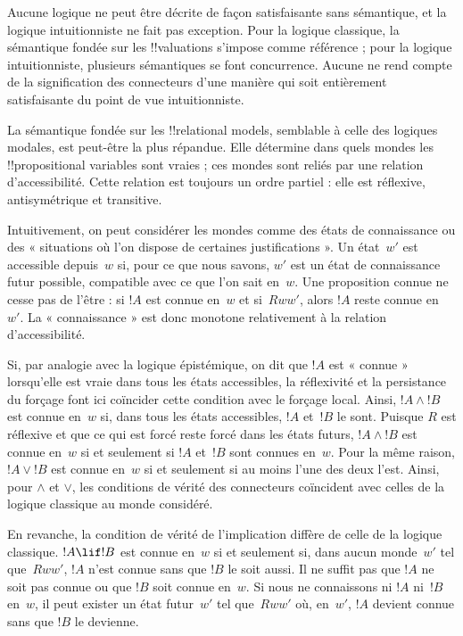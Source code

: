\documentclass[../../../include/open-logic-section]{subfiles}
\begin{document}


Aucune logique ne peut être décrite de façon satisfaisante sans
sémantique, et la logique intuitionniste ne fait pas exception. Pour
la logique classique, la sémantique fondée sur les !!{valuation}s
s'impose comme référence ; pour la logique intuitionniste, plusieurs
sémantiques se font concurrence. Aucune ne rend compte de la
signification des connecteurs d'une manière qui soit entièrement
satisfaisante du point de vue intuitionniste.

La sémantique fondée sur les !!{relational model}s, semblable à celle
des logiques modales, est peut-être la plus répandue. Elle détermine
dans quels mondes les !!{propositional variable}s sont vraies ; ces
mondes sont reliés par une relation d'accessibilité. Cette relation
est toujours un ordre partiel : elle est réflexive, antisymétrique et
transitive.

Intuitivement, on peut considérer les mondes comme des états de
connaissance ou des « situations où l'on dispose de certaines
justifications ». Un état~$w'$ est accessible depuis~$w$ si, pour ce
que nous savons, $w'$ est un état de connaissance futur possible,
compatible avec ce que l'on sait en~$w$. Une proposition connue ne
cesse pas de l'être : si $!A$ est connue en~$w$ et si~$Rww'$, alors
$!A$ reste connue en~$w'$. La « connaissance » est donc monotone
relativement à la relation d'accessibilité.

Si, par analogie avec la logique épistémique, on dit que $!A$ est
« connue » lorsqu'elle est vraie dans tous les états accessibles,
la réflexivité et la persistance du forçage font ici coïncider cette
condition avec le forçage local. Ainsi, $!A \land !B$ est connue
en~$w$ si, dans tous les états accessibles, $!A$ et~$!B$ le sont.
Puisque $R$ est réflexive et que ce qui est forcé reste forcé dans les
états futurs, $!A \land !B$ est connue en~$w$ si et seulement si $!A$
et~$!B$ sont connues en~$w$. Pour la même raison, $!A \lor !B$ est
connue en~$w$ si et seulement si au moins l'une des deux l'est. Ainsi,
pour $\land$ et $\lor$, les conditions de vérité des connecteurs
coïncident avec celles de la logique classique au monde considéré.

En revanche, la condition de vérité de l'implication diffère de celle
de la logique classique. $!A \lif !B$ est connue en~$w$ si et seulement
si, dans aucun monde~$w'$ tel que~$Rww'$, $!A$ n'est connue sans que
$!B$ le soit aussi. Il ne suffit pas que $!A$ ne soit pas connue ou
que $!B$ soit connue en~$w$. Si nous ne connaissons ni $!A$ ni~$!B$
en~$w$, il peut exister un état futur~$w'$ tel que~$Rww'$ où, en~$w'$,
$!A$ devient connue sans que $!B$ le devienne.
\end{document}
